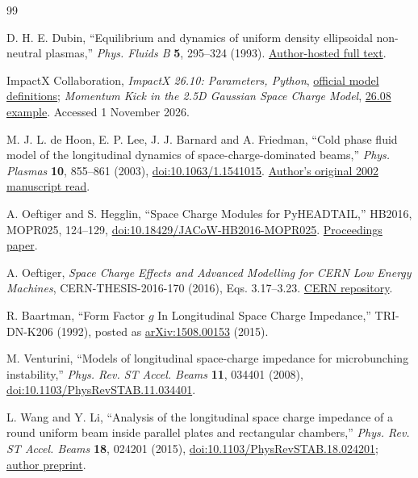 \clearpage
\begin{thebibliography}{99}
\small
\raggedright
{}
D. H. E. Dubin, ``Equilibrium and dynamics of uniform density ellipsoidal
non-neutral plasmas,'' \emph{Phys. Fluids B} \textbf{5}, 295--324 (1993).
\href{https://nnp.ucsd.edu/pdf_files/PFB_5_295_1993.PDF}{Author-hosted full text}.

ImpactX Collaboration, \emph{ImpactX 26.10: Parameters, Python},
\href{https://impactx.readthedocs.io/en/latest/usage/python.html}{official model definitions};
\emph{Momentum Kick in the 2.5D Gaussian Space Charge Model},
\href{https://impactx.readthedocs.io/en/26.08/usage/examples/space_charge_gaussian_kick/README.html}{26.08 example}.
Accessed 1 November 2026.

M. J. L. de Hoon, E. P. Lee, J. J. Barnard and A. Friedman,
``Cold phase fluid model of the longitudinal dynamics of space-charge-dominated
beams,'' \emph{Phys. Plasmas} \textbf{10}, 855--861 (2003),
\href{https://doi.org/10.1063/1.1541015}{doi:10.1063/1.1541015}.
\href{https://www.researchgate.net/publication/234991093_Cold_phase_fluid_model_of_the_longitudinal_dynamics_of_space-charge-dominated_beams}{Author's original 2002 manuscript read}.

A. Oeftiger and S. Hegglin, ``Space Charge Modules for PyHEADTAIL,''
HB2016, MOPR025, 124--129,
\href{https://doi.org/10.18429/JACoW-HB2016-MOPR025}{doi:10.18429/JACoW-HB2016-MOPR025}.
\href{https://proceedings.jacow.org/hb2016/papers/mopr025.pdf}{Proceedings paper}.

A. Oeftiger, \emph{Space Charge Effects and Advanced Modelling for CERN Low
Energy Machines}, CERN-THESIS-2016-170 (2016), Eqs. 3.17--3.23.
\href{https://repository.cern/records/d4y9h-b7r93}{CERN repository}.

R. Baartman, ``Form Factor $g$ In Longitudinal Space Charge Impedance,''
TRI-DN-K206 (1992), posted as
\href{https://arxiv.org/abs/1508.00153}{arXiv:1508.00153} (2015).

M. Venturini, ``Models of longitudinal space-charge impedance for microbunching
instability,'' \emph{Phys. Rev. ST Accel. Beams} \textbf{11}, 034401 (2008),
\href{https://doi.org/10.1103/PhysRevSTAB.11.034401}{doi:10.1103/PhysRevSTAB.11.034401}.

L. Wang and Y. Li, ``Analysis of the longitudinal space charge impedance of a
round uniform beam inside parallel plates and rectangular chambers,''
\emph{Phys. Rev. ST Accel. Beams} \textbf{18}, 024201 (2015),
\href{https://doi.org/10.1103/PhysRevSTAB.18.024201}{doi:10.1103/PhysRevSTAB.18.024201};
\href{https://arxiv.org/abs/1404.5637}{author preprint}.


\end{thebibliography}
